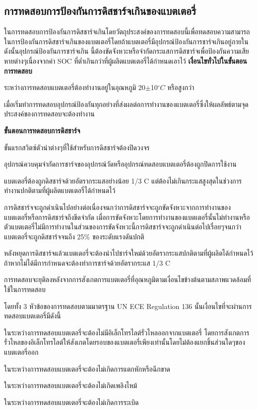 \subsection{การทดสอบการป้องกันการดิสชาร์จเกินของแบตเตอรี่}
ในการทดสอบการป้องกันการดิสชาร์จเกินโดยวัตถุประสงค์ของการทดสอบนี้เพื่อทดสอบความสามารถในการป้องกันการดิสชาร์จเกินของแบตเตอรี่โดยถ้าแบตเตอรี่มีอุปกรณ์ป้องกันการชาร์จเกินอยู่ภายในดังนั้นอุปกรณ์ป้องกันการชาร์จเกิน
นี้ต้องขัดจังหวะหรือจำกัดกระแสการดิสชาร์จเพื่อป้องกันความเสียหายต่างๆเนื่องจากค่า SOC ที่ต่ำเกินกว่าที่ผู้ผลิตแบตเตอรี่ได้กำหนดเอาไว้
\newline
\newline
\textbf{เงื่อนไขทั่วไปในขั้นตอนการทดสอบ}
\begin{itemize}
{\item ระหว่างการทดสอบแบตเตอรี่ต้องทำงานอยู่ในอุณหภูมิ 20$\pm$10$^{\circ}C$ หรือสูงกว่า}
{\item เมื่อเริ่มทำการทดสอบอุปกรณ์ป้องกันทุกอย่างที่ส่งผลต่อการทำงานของแบตเตอรี่ซึ่งให้ผลลัพธ์ตามจุดประสงค์ของการทดสอบจะต้องทำงาน}
\end{itemize}
\textbf{ขั้นตอนการทดสอบการดิสชาร์จ}
\begin{itemize}
{\item ขั้นแรกสวิตซ์ตัวนำต่างๆที่ใช้สำหรับการดิสชาร์จต้องปิดวงจร}
{\item อุปกรณ์ควบคุมจำกัดการชาร์จของอุปกรณ์วัดหรืออุปกรณ์ทดสอบแบตเตอรี่ต้องถูกปิดการใช้งาน}
{\item แบตเตอรี่ต้องถูกดิสชาร์จด้วยอัตรากระแสอย่างน้อย 1/3 C แต่ต้องไม่เกินกระแสสูงสุดในช่วงการทำงานปกติตามที่ผู้ผลิตแบตเตอรี่ได้กำหนดไว้}
{\item การดิสชาร์จจะถูกดำเนินไปอย่างต่อเนื่องจนกว่าการดิสชาร์จจะถูกขัดจังหวะจากการทำงานของแบตเตอรี่หรือการดิสชาร์จถึงขีดจำกัด เมื่อการขัดจังหวะโดยการทำงานของแบตเตอรี่นั้นไม่ทำงานหรือตัวแบตเตอรี่ไม่มีการทำงานในส่วนของการขัดจังหวะนี้การดิสชาร์จจะถูกดำเนินต่อไปเรื่อยๆจนกว่าแบตเตอรี่จะถูกดิสชาร์จจนถึง 25\% ของระดับแรงดันปกติ}
{\item หลังหยุดการดิสชาร์จแล้วแบตเตอรี่จะต้องนำไปชาร์จใหม่ด้วยอัตรากระแสปกติตามที่ผู้ผลิตได้กำหนดไว้ถ้าหากไม่ได้มีการกำหนดจะต้องทำการชาร์จด้วยอัตรากระแส 1/3 C}
{\item การทดสอบจะยุติลงหลังจากการสังเกตการแบตเตอรี่ที่อุณหภูมิตามเงื่อนไขข้างต้นตามสภาพแวดล้อมที่ใช้ในการทดสอบ}
\end{itemize}
โดยทั้ง 3 หัวข้อของการทดสอบตามมาตรฐาน UN ECE Regulation 136 นั้นเงื่อนไขที่จะผ่านการทดสอบแบตเตอรี่มีดังนี้
\begin{enumerate}
{\item ในระหว่างการทดสอบแบตเตอรี่จะต้องไม่มีอิเล็กโทรไลต์รั่วไหลออกจากแบตเตอรี่ โดยการสังเกตการรั่วไหลของอิเล็กโทรไลต์ให้สังเกตโดยรอบของแบตเตอรี่เพียงเท่านั้นโดยไม่ต้องแยกชิ้นส่วนใดๆของแบตเตอรี่ออก}
{\item ในระหว่างการทดสอบแบตเตอรี่จะต้องไม่เกิดการแตกหักหรือฉีกขาด}
{\item ในระหว่างการทดสอบแบตเตอรี่จะต้องไม่เกิดเพลิงไหม้}
{\item ในระหว่างการทดสอบแบตเตอรี่จะต้องไม่เกิดการระเบิด}
\end{enumerate}
